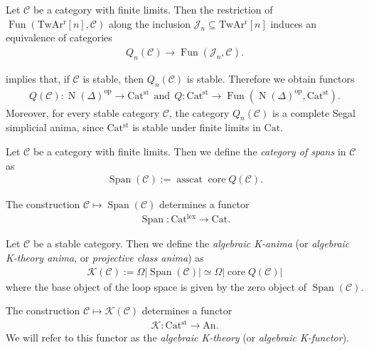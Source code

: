 \documentclass[a4paper,dvipdfmx,11pt,reqno]{amsart}
\DeclareMathOperator{\myop}{op}
\DeclareMathOperator{\N}{N}
\DeclareMathOperator{\Fun}{Fun}
\DeclareMathOperator{\core}{core}
\DeclareMathOperator{\asscat}{asscat}
\DeclareMathOperator{\Span}{Span}
\newcommand{\C}{\mathcal{C}}
\newcommand{\J}{\mathcal{J}}
\newcommand{\K}{\mathcal{K}}
\newcommand{\An}{\mathrm{An}}
\newcommand{\Cat}{\mathrm{Cat}}
\newcommand{\Catlex}{\mathrm{Cat^{lex}}}
\newcommand{\Catst}{\mathrm{Cat^{st}}}
\newcommand{\TwArr}{\mathrm{TwAr^{r}}}
\begin{document}
\begin{lemma} \label{lem.Q_nC_is_equivalent_to_FunJ_n_C}
  Let $\C$ be a category with finite limits.
  Then the restriction of $\Fun(\TwArr[n],\C)$ along the inclusion $\J_n \subseteq \TwArr[n]$ induces an equivalence of categories
  \begin{align*}
    Q_n(\C) \to \Fun(\J_n,\C).
  \end{align*}
\end{lemma}

\begin{remark}
   implies that, if $\C$ is stable, then $Q_n(\C)$ is stable.
  Therefore we obtain functors
  \begin{align*}
    Q(\C) : \N(\Delta)^{\myop} \to \Catst ~~ \text{and} ~~ Q : \Catst \to \Fun(\N(\Delta)^{\myop},\Catst).
  \end{align*}
  Moreover, for every stable category $\C$, the category $Q_n(\C)$ is a complete Segal simplicial anima, since $\Catst$ is stable under finite limits in $\Cat$.
\end{remark}

\begin{definition}
  Let $\C$ be a category with finite limits.
  Then we define the \textit{category of spans} in $\C$ as 
  \begin{align*}
    \Span(\C) := \asscat \core Q(\C).
  \end{align*}

  The construction $\C \mapsto \Span(\C)$ determines a functor 
  \begin{align*}
    \Span : \Catlex \to \Cat.
  \end{align*}
\end{definition}

\begin{definition} \label{def.algebraic_k-anima_using_Q}
  Let $\C$ be a stable category.
  Then we define the \textit{algebraic K-anima} (or \textit{algebraic K-theory anima}, or \textit{projective class anima}) as 
  \begin{align*}
    \K(\C) := \Omega|\Span(\C)| \simeq \Omega|\core Q(\C)|
  \end{align*}
  where the base object of the loop space is given by the zero object of $\Span(\C)$.

  The construction $\C \mapsto \K(\C)$ determines a functor 
  \begin{align*}
    \K : \Catst \to \An. 
  \end{align*}
  We will refer to this functor as the \textit{algebraic K-theory} (or \textit{algebraic K-functor}).
\end{definition}
\end{document}
